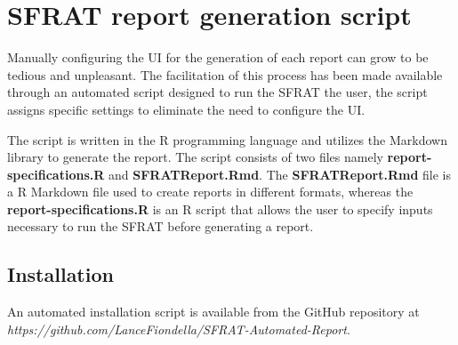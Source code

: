 \documentclass[conference]{IEEEtran}
\begin{document}
\section{SFRAT report generation script}\label{sec:Script}

Manually configuring the UI for the generation of each report can grow to be tedious and unpleasant. The facilitation of this process has been made available through an automated script designed to run the SFRAT the user, the script assigns specific settings to eliminate the need to configure the UI.

The script is written in the R programming language and utilizes the Markdown library to generate the report. The script consists of two files namely \textbf{report-specifications.R} and \textbf{SFRATReport.Rmd}. The \textbf{SFRATReport.Rmd} file is a R Markdown file used to create reports in different formats, whereas the \textbf{report-specifications.R} is an R script that allows the user to specify inputs necessary to run the SFRAT before generating a report.

\subsection{Installation}\label{sec:ScriptInstall}
An automated installation script is available from the GitHub repository at \textit{https://github.com/LanceFiondella/SFRAT-Automated-Report}.
\end{document}
